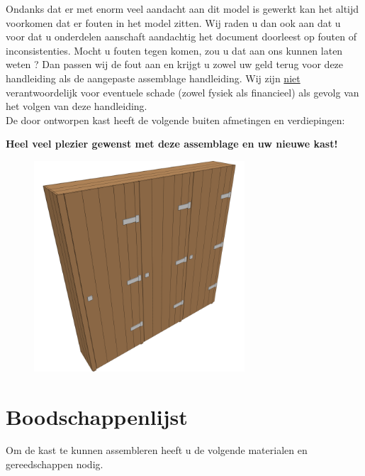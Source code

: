 \documentclass{article}
\begin{document}
Ondanks dat er met enorm veel aandacht aan dit model is gewerkt kan het altijd voorkomen dat er fouten in het model zitten. Wij raden u dan ook aan dat u voor dat u onderdelen aanschaft aandachtig het document doorleest op fouten of inconsistenties. Mocht u fouten tegen komen, zou u dat aan ons kunnen laten weten ? Dan passen wij de fout aan en krijgt u zowel uw geld terug voor deze handleiding als de aangepaste assemblage handleiding. Wij zijn \underline{niet} verantwoordelijk voor eventuele schade (zowel fysiek als financieel) als gevolg van het volgen van deze handleiding. \\

De door ontworpen kast heeft de volgende buiten afmetingen en verdiepingen: \\

 

\begin{center}
\textbf{Heel veel plezier gewenst met deze assemblage en uw nieuwe kast!}
\end{center}

\begin{figure}[h!]
    \centering
    \includegraphics[width=0.7\textwidth]{scene 12 - compleet.png}
\end{figure}

\clearpage
\newpage

\section{Boodschappenlijst}

Om de kast te kunnen assembleren heeft u de volgende materialen en gereedschappen nodig. \\
\end{document}
